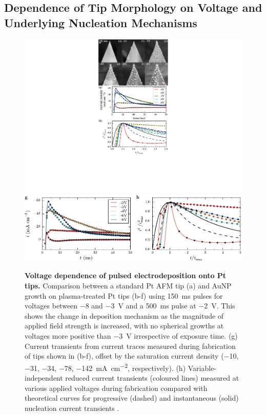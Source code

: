 \documentclass{article}
\begin{document}
\subsection{Dependence of Tip Morphology on Voltage and Underlying Nucleation Mechanisms}

\begin{figure}[bt]
\centering
\includegraphics{figures/tip_voltage_dependence}\\
\includegraphics{figures/current_transients}
\caption[Voltage dependence of pulsed electrodeposition onto Pt tips]{\textbf{Voltage dependence of pulsed electrodeposition onto Pt tips.} Comparison between a standard Pt AFM tip (a) and AuNP growth on plasma-treated Pt tips (b-f) using \SI{150}{ms} pulses for voltages between \num{-8} and \SI{-3}{V} and a \SI{500}{ms} pulse at \SI{-2}{V}. This shows the change in deposition mechanism as the magnitude of applied field strength is increased, with no spherical growths at voltages more positive than \SI{-3}{V} irrespective of exposure time. (g) Current transients from current traces measured during fabrication of tips shown in (b-f), offset by the saturation current density (\num{-10}, \num{-31}, \num{-34}, \num{-78}, \SI{-142}{\milli\ampere\per\centi\metre\squared}, respectively). (h) Variable-independent reduced current transients (coloured lines) measured at various applied voltages during fabrication compared with theoretical curves for progressive (dashed) and instantaneous (solid) nucleation current transients \cite{scharifker1983}.}
\label{fig:electrochemical_voltage_dependence}
\end{figure}
\end{document}

